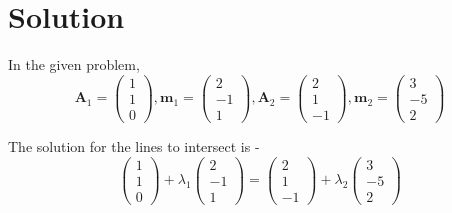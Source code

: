 \documentclass[journal,12pt,twocolumn]{IEEEtran}
\begin{document}
\section{Solution}
In the given problem, 
\begin{equation}
    \mathbf{A}_1 = 
    \begin{pmatrix}
1 \\ 
1 \\ 
0 
\end{pmatrix},
\mathbf{m}_1 = 
    \begin{pmatrix}
2 \\ 
-1 \\ 
1 
\end{pmatrix},
\mathbf{A}_2 = 
    \begin{pmatrix}
2 \\ 
1 \\ 
-1 
\end{pmatrix},
\mathbf{m}_2 = 
    \begin{pmatrix}
3 \\ 
-5 \\ 
2 
\end{pmatrix}

\end{equation}

The solution for the lines to intersect is - 
\begin{equation}\label{eq1}
     \begin{pmatrix}
1 \\ 
1 \\ 
0 
\end{pmatrix} + \lambda_1 \begin{pmatrix}
2 \\ 
-1 \\ 
1 
\end{pmatrix} = 
\begin{pmatrix}
2 \\ 
1 \\ 
-1 
\end{pmatrix} + \lambda_2 \begin{pmatrix}
3 \\ 
-5 \\ 
2 
\end{pmatrix}

\end{equation}
\end{document}
